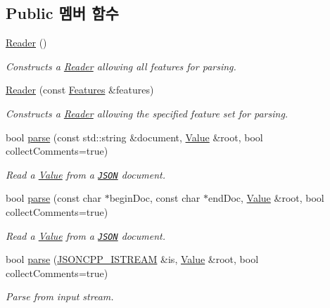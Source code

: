 \subsection*{Public 멤버 함수}
\begin{DoxyCompactItemize}
\item 
\hyperlink{class_json_1_1_reader_a0b3c4e24c8393354bab57a6ba3ffc27f}{Reader} ()
\begin{DoxyCompactList}\small\item\em Constructs a \hyperlink{class_json_1_1_reader}{Reader} allowing all features for parsing. \end{DoxyCompactList}\item 
\hyperlink{class_json_1_1_reader_a45f17831118337309180313e93ac33f8}{Reader} (const \hyperlink{class_json_1_1_features}{Features} \&features)
\begin{DoxyCompactList}\small\item\em Constructs a \hyperlink{class_json_1_1_reader}{Reader} allowing the specified feature set for parsing. \end{DoxyCompactList}\item 
bool \hyperlink{class_json_1_1_reader_af1da6c976ad1e96c742804c3853eef94}{parse} (const std\+::string \&document, \hyperlink{class_json_1_1_value}{Value} \&root, bool collect\+Comments=true)
\begin{DoxyCompactList}\small\item\em Read a \hyperlink{class_json_1_1_value}{Value} from a \href{http://www.json.org}{\tt J\+S\+ON} document. \end{DoxyCompactList}\item 
bool \hyperlink{class_json_1_1_reader_ac71ef2b64c7c27b062052e692af3fb32}{parse} (const char $\ast$begin\+Doc, const char $\ast$end\+Doc, \hyperlink{class_json_1_1_value}{Value} \&root, bool collect\+Comments=true)
\begin{DoxyCompactList}\small\item\em Read a \hyperlink{class_json_1_1_value}{Value} from a \href{http://www.json.org}{\tt J\+S\+ON} document. \end{DoxyCompactList}\item 
bool \hyperlink{class_json_1_1_reader_a6d5d0e23f68749d2f17feece4ccf504d}{parse} (\hyperlink{json_8h_a15f2f70b2ce0a2abd0f8112393dbc4de}{J\+S\+O\+N\+C\+P\+P\+\_\+\+I\+S\+T\+R\+E\+AM} \&is, \hyperlink{class_json_1_1_value}{Value} \&root, bool collect\+Comments=true)
\begin{DoxyCompactList}\small\item\em Parse from input stream. \end{DoxyCompactList}\item 

\end{DoxyCompactItemize}
